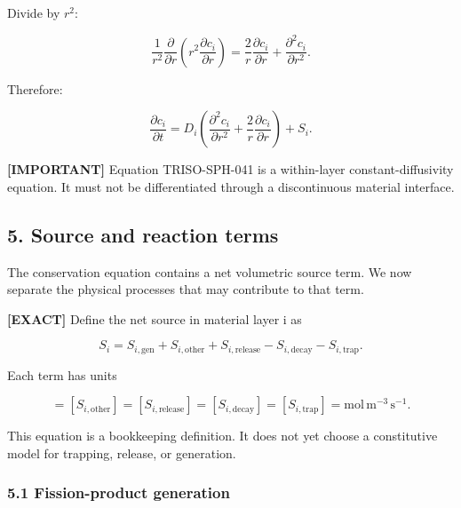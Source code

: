 \documentclass[11pt,a4paper]{article}
\begin{document}
Divide by $r^2$:

\begin{equation}
\frac1{r^2}\frac{\partial}{\partial r}\left(r^2\frac{\partial c_i}{\partial r}\right)=\frac2r\frac{\partial c_i}{\partial r}+\frac{\partial^2c_i}{\partial r^2}.
\tag{TRISO-SPH-040}
\label{eq:triso-sph-040}
\end{equation}

Therefore:

\begin{equation}
\boxed{\frac{\partial c_i}{\partial t}=D_i\left(\frac{\partial^2c_i}{\partial r^2}+\frac2r\frac{\partial c_i}{\partial r}\right)+S_i.}
\tag{TRISO-SPH-041}
\label{eq:triso-sph-041}
\end{equation}

\textbf{[IMPORTANT]} Equation TRISO-SPH-041 is a within-layer constant-diffusivity equation. It must not be differentiated through a discontinuous material interface.

\subsection*{5. Source and reaction terms}

The conservation equation contains a net volumetric source term. We now separate the physical processes that may contribute to that term.

\textbf{[EXACT]} Define the net source in material layer i as

\begin{equation}
S_i=S_{i,\mathrm{gen}}+S_{i,\mathrm{other}}+S_{i,\mathrm{release}}-S_{i,\mathrm{decay}}-S_{i,\mathrm{trap}}.
\tag{TRISO-GOV-100}
\label{eq:triso-gov-100}
\end{equation}

Each term has units

\begin{equation}
[S_{i,\mathrm{gen}}]
=
[S_{i,\mathrm{other}}]
=
[S_{i,\mathrm{release}}]
=
[S_{i,\mathrm{decay}}]
=
[S_{i,\mathrm{trap}}]
=
\mathrm{mol\,m^{-3}\,s^{-1}}.
\tag{TRISO-GOV-101}
\label{eq:triso-gov-101}
\end{equation}

This equation is a bookkeeping definition. It does not yet choose a constitutive model for trapping, release, or generation.

\subsubsection*{5.1 Fission-product generation}
\end{document}
